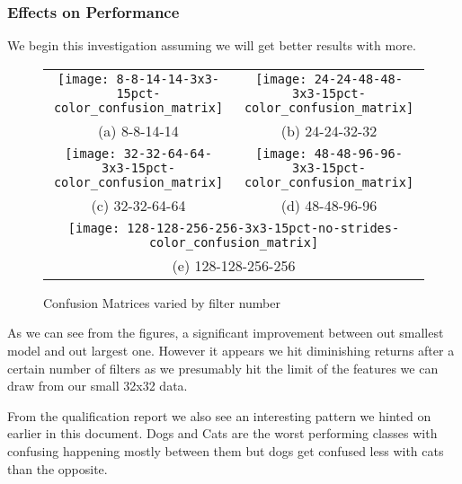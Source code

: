 \subsubsection{Effects on Performance}
We begin this investigation assuming we will get better results with more. 
\begin{figure}
	\begin{tabular}{cc}
		\texttt{[image: 8-8-14-14-3x3-15pct-color\_confusion\_matrix]} &   \texttt{[image: 24-24-48-48-3x3-15pct-color\_confusion\_matrix]} \\
		(a) 8-8-14-14 & (b) 24-24-32-32 \\[6pt]
		\texttt{[image: 32-32-64-64-3x3-15pct-color\_confusion\_matrix]} &   \texttt{[image: 48-48-96-96-3x3-15pct-color\_confusion\_matrix]} \\
		(c) 32-32-64-64 & (d) 48-48-96-96 \\[6pt]
		\multicolumn{2}{c}{\texttt{[image: 128-128-256-256-3x3-15pct-no-strides-color\_confusion\_matrix]} }\\
		\multicolumn{2}{c}{(e) 128-128-256-256}
	\end{tabular}
	\caption{Confusion Matrices varied by filter number}
\end{figure}

As we can see from the figures, a significant improvement between out smallest model and out largest one. However it appears we hit diminishing returns after a certain number of filters as we presumably hit the limit of the features we can draw from our small 32x32 data.

From the qualification report we also see an interesting pattern we hinted on earlier in this document. Dogs and Cats are the worst performing classes with confusing happening mostly between them but dogs get confused less with cats than the opposite.

